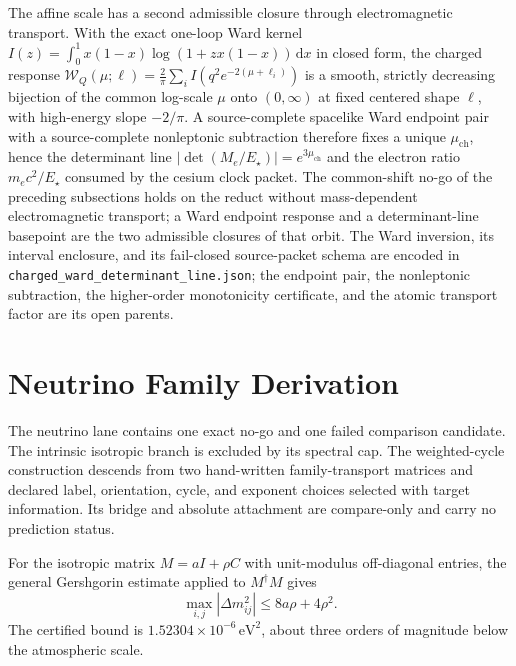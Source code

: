 \documentclass[11pt]{article}
\begin{document}
The affine scale has a second admissible closure through electromagnetic
transport.  With the exact one-loop Ward kernel
\(I(z)=\int_0^1x(1-x)\log(1+zx(1-x))\,\mathrm dx\) in closed form, the
charged response
\(\mathcal W_Q(\mu;\ell)=\frac2\pi\sum_iI(q^2e^{-2(\mu+\ell_i)})\) is a
smooth, strictly decreasing bijection of the common log-scale \(\mu\) onto
\((0,\infty)\) at fixed centered shape \(\ell\), with high-energy slope
\(-2/\pi\).  A source-complete spacelike Ward endpoint pair with a
source-complete nonleptonic subtraction therefore fixes a unique
\(\mu_{\mathrm{ch}}\), hence the determinant line
\(|\det(M_e/E_\star)|=e^{3\mu_{\mathrm{ch}}}\) and the electron ratio
\(m_ec^2/E_\star\) consumed by the cesium clock packet.  The common-shift
no-go of the preceding subsections holds on the reduct without
mass-dependent electromagnetic transport; a Ward endpoint response and a
determinant-line basepoint are the two admissible closures of that orbit.
The Ward inversion, its interval enclosure, and its fail-closed source-packet
schema are encoded in \texttt{charged\_ward\_determinant\_line.json}; the
endpoint pair, the nonleptonic subtraction, the higher-order monotonicity
certificate, and the atomic transport factor are its open parents.

\section{Neutrino Family Derivation}

The neutrino lane contains one exact no-go and one failed comparison candidate. The intrinsic
isotropic branch is excluded by its spectral cap. The weighted-cycle construction descends from
two hand-written family-transport matrices and declared label, orientation, cycle, and exponent
choices selected with target information. Its bridge and absolute attachment are compare-only and
carry no prediction status.

For the isotropic matrix \(M=aI+\rho C\) with unit-modulus off-diagonal entries, the general
Gershgorin estimate applied to \(M^\dagger M\) gives
\[
\max_{i,j}|\Delta m_{ij}^2|\leq 8a\rho+4\rho^2.
\]
The certified bound is \(1.52304\times10^{-6}\,\mathrm{eV}^2\), about three orders of magnitude
below the atmospheric scale.
\end{document}
